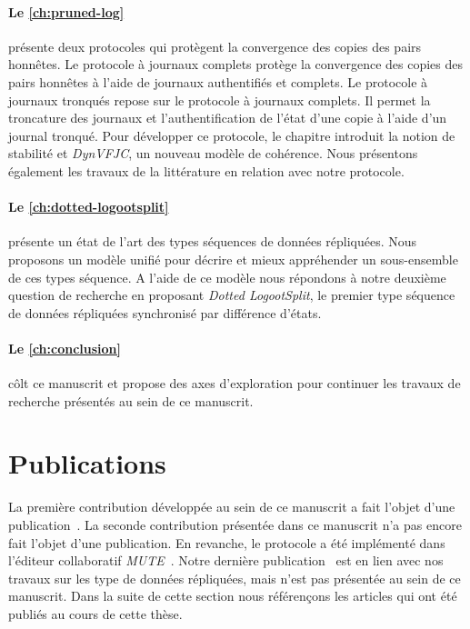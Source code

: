 \paragraph{Le \autoref{ch:pruned-log}} présente deux protocoles qui protègent la convergence des copies des pairs honnêtes.
Le protocole à journaux complets protège la convergence des copies des pairs honnêtes à l'aide de journaux authentifiés et complets.
Le protocole à journaux tronqués repose sur le protocole à journaux complets.
Il permet la troncature des journaux et l'authentification de l'état d'une copie à l'aide d'un journal tronqué.
Pour développer ce protocole, le chapitre introduit la notion de stabilité et \emph{DynVFJC}, un nouveau modèle de cohérence.
Nous présentons également les travaux de la littérature en relation avec notre protocole.

\paragraph{Le \autoref{ch:dotted-logootsplit}} présente un état de l'art des types séquences de données répliquées.
Nous proposons un modèle unifié pour décrire et mieux appréhender un sous-ensemble de ces types séquence.
A l'aide de ce modèle nous répondons à notre deuxième question de recherche en proposant \emph{Dotted LogootSplit}, le premier type séquence de données répliquées synchronisé par différence d'états.

\paragraph{Le \autoref{ch:conclusion}} côlt ce manuscrit et propose des axes d'exploration pour continuer les travaux de recherche présentés au sein de ce manuscrit.


\section{Publications}

La première contribution développée au sein de ce manuscrit a fait l'objet d'une publication~\autocite{2018_elvinger_prunable-auth-log}.
La seconde contribution présentée dans ce manuscrit n'a pas encore fait l'objet d'une publication.
En revanche, le protocole a été implémenté dans l'éditeur collaboratif \emph{MUTE}~\autocite{2017_nicolas-mute-demo}.
Notre dernière publication~\autocite{2019_yu_genericundo} est en lien avec nos travaux sur les type de données répliquées, mais n'est pas présentée au sein de ce manuscrit.
Dans la suite de cette section nous référençons les articles qui ont été publiés au cours de cette thèse.


